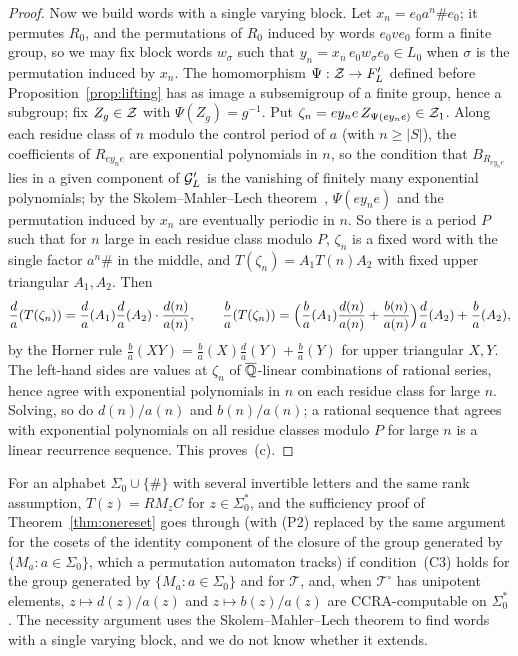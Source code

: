 \begin{proof}
Now we build words with a single varying block. Let $x_n=e_0a^n\#e_0$; it permutes $R_0$, and the permutations of $R_0$ induced by words $e_0ve_0$ form a finite group, so we may fix block words $w_\sigma$ such that $y_n=x_n\,e_0w_{\sigma}e_0\in L_0$ when $\sigma$ is the permutation induced by $x_n$. The homomorphism $\Psi:\mathcal{Z}\to F'_L$ defined before Proposition~\ref{prop:lifting} has as image a subsemigroup of a finite group, hence a subgroup; fix $Z_g\in\mathcal{Z}$ with $\Psi(Z_g)=g^{-1}$. Put $\zeta_n=ey_ne\,Z_{\Psi(ey_ne)}\in\mathcal{Z}_1$. Along each residue class of $n$ modulo the control period of $a$ (with $n\ge|S|$), the coefficients of $R_{ey_ne}$ are exponential polynomials in $n$, so the condition that $B_{R_{ey_ne}}$ lies in a given component of $\mathcal{G}'_L$ is the vanishing of finitely many exponential polynomials; by the Skolem--Mahler--Lech theorem~\cite{EPSW03}, $\Psi(ey_ne)$ and the permutation induced by $x_n$ are eventually periodic in $n$. So there is a period $P$ such that for $n$ large in each residue class modulo $P$, $\zeta_n$ is a fixed word with the single factor $a^n\#$ in the middle, and $T(\zeta_n)=A_1T(n)A_2$ with fixed upper triangular $A_1,A_2$. Then
\[
\frac{d}{a}(T(\zeta_n))=\frac da(A_1)\frac da(A_2)\cdot\frac{d(n)}{a(n)},\qquad
\frac ba(T(\zeta_n))=\Bigl(\frac ba(A_1)\frac{d(n)}{a(n)}+\frac{b(n)}{a(n)}\Bigr)\frac da(A_2)+\frac ba(A_2),
\]
by the Horner rule $\frac ba(XY)=\frac ba(X)\frac da(Y)+\frac ba(Y)$ for upper triangular $X,Y$. The left-hand sides are values at $\zeta_n$ of $\overline{\mathbb{Q}}$-linear combinations of rational series, hence agree with exponential polynomials in $n$ on each residue class for large $n$. Solving, so do $d(n)/a(n)$ and $b(n)/a(n)$; a rational sequence that agrees with exponential polynomials on all residue classes modulo $P$ for large $n$ is a linear recurrence sequence. This proves~(c).
\end{proof}

\begin{remark}\label{rem:severalletters}
For an alphabet $\Sigma_0\cup\{\#\}$ with several invertible letters and the same rank assumption, $T(z)=RM_zC$ for $z\in\Sigma_0^*$, and the sufficiency proof of Theorem~\ref{thm:onereset} goes through (with (P2) replaced by the same argument for the cosets of the identity component of the closure of the group generated by $\{M_a:a\in\Sigma_0\}$, which a permutation automaton tracks) if condition~(C3) holds for the group generated by $\{M_a:a\in\Sigma_0\}$ and for $\mathcal T$, and, when $\mathcal T^\circ$ has unipotent elements, $z\mapsto d(z)/a(z)$ and $z\mapsto b(z)/a(z)$ are CCRA-computable on $\Sigma_0^*$. The necessity argument uses the Skolem--Mahler--Lech theorem to find words with a single varying block, and we do not know whether it extends.
\end{remark}


